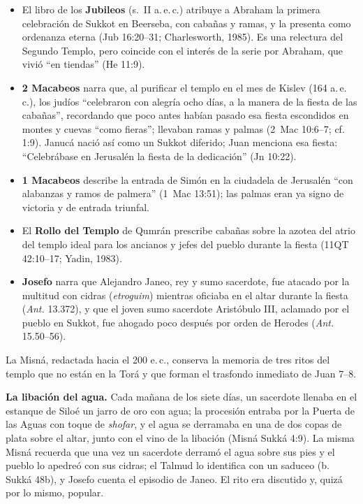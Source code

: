 \documentclass[11pt,letterpaper]{article}
\begin{document}
\begin{itemize}
\item El libro de los \textbf{Jubileos} (s.~II a.\,e.\,c.) atribuye a Abraham la primera celebración de Sukkot en Beerseba, con cabañas y ramas, y la presenta como ordenanza eterna (Jub 16:20--31; Charlesworth, 1985). Es una relectura del Segundo Templo, pero coincide con el interés de la serie por Abraham, que vivió ``en tiendas'' (He 11:9).
\item \textbf{2 Macabeos} narra que, al purificar el templo en el mes de Kislev (164 a.\,e.\,c.), los judíos ``celebraron con alegría ocho días, a la manera de la fiesta de las cabañas'', recordando que poco antes habían pasado esa fiesta escondidos en montes y cuevas ``como fieras''; llevaban ramas y palmas (2~Mac 10:6--7; cf. 1:9). Janucá nació así como un Sukkot diferido; Juan menciona esa fiesta: ``Celebrábase en Jerusalén la fiesta de la dedicación'' (Jn 10:22).
\item \textbf{1 Macabeos} describe la entrada de Simón en la ciudadela de Jerusalén ``con alabanzas y ramos de palmera'' (1~Mac 13:51); las palmas eran ya signo de victoria y de entrada triunfal.
\item El \textbf{Rollo del Templo} de Qumrán prescribe cabañas sobre la azotea del atrio del templo ideal para los ancianos y jefes del pueblo durante la fiesta (11QT 42:10--17; Yadin, 1983).
\item \textbf{Josefo} narra que Alejandro Janeo, rey y sumo sacerdote, fue atacado por la multitud con cidras (\emph{etroguim}) mientras oficiaba en el altar durante la fiesta (\emph{Ant.} 13.372), y que el joven sumo sacerdote Aristóbulo III, aclamado por el pueblo en Sukkot, fue ahogado poco después por orden de Herodes (\emph{Ant.} 15.50--56).
\end{itemize}

La Misná, redactada hacia el 200 e.\,c., conserva la memoria de tres ritos del templo que no están en la Torá y que forman el trasfondo inmediato de Juan 7--8.

\textbf{La libación del agua.} Cada mañana de los siete días, un sacerdote llenaba en el estanque de Siloé un jarro de oro con agua; la procesión entraba por la Puerta de las Aguas con toque de \emph{shofar}, y el agua se derramaba en una de dos copas de plata sobre el altar, junto con el vino de la libación (Misná Sukká 4:9). La misma Misná recuerda que una vez un sacerdote derramó el agua sobre sus pies y el pueblo lo apedreó con sus cidras; el Talmud lo identifica con un saduceo (b. Sukká 48b), y Josefo cuenta el episodio de Janeo. El rito era discutido y, quizá por lo mismo, popular.
\end{document}
